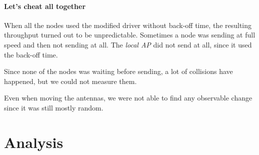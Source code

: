 \documentclass[12pt,a4paper]{article}
\begin{document}
\paragraph{Let's cheat all together}
When all the nodes used the modified driver without back-off time, the resulting throughput turned out to be unpredictable. Sometimes a node was sending at full speed and then not sending at all. The \emph{local AP} did not send at all, since it used the back-off time.

Since none of the nodes was waiting before sending, a lot of collisions have happened, but we could not measure them.

Even when moving the antennas, we were not able to find any observable change since it was still mostly random.
\section{Analysis}


\end{document}

